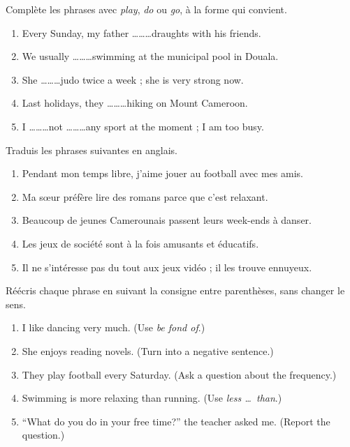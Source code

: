 \documentclass[11pt]{article}
\newcounter{popsec}
\newcounter{popsub}
\newcommand{\courssub}[1]{%
  \stepcounter{popsub}%
  \par\vspace{9pt}\noindent{\popxbold\fontsize{11.5}{13}\selectfont\color{popink}{\color{poporange}\thepopsec.\thepopsub}\hspace{6pt}#1}\par\nopagebreak\vspace{4pt}
}
\begin{document}
\begin{exercice}
Complète les phrases avec \emph{play}, \emph{do} ou \emph{go}, à la forme qui convient.
\begin{enumerate}
\item Every Sunday, my father \ldots\ldots\ldots draughts with his friends.
\item We usually \ldots\ldots\ldots swimming at the municipal pool in Douala.
\item She \ldots\ldots\ldots judo twice a week ; she is very strong now.
\item Last holidays, they \ldots\ldots\ldots hiking on Mount Cameroon.
\item I \ldots\ldots\ldots not \ldots\ldots\ldots any sport at the moment ; I am too busy.
\end{enumerate}
\end{exercice}

\courssub{Je m'entraîne}

\begin{exercice}[Traduction]
Traduis les phrases suivantes en anglais.
\begin{enumerate}
\item Pendant mon temps libre, j'aime jouer au football avec mes amis.
\item Ma sœur préfère lire des romans parce que c'est relaxant.
\item Beaucoup de jeunes Camerounais passent leurs week-ends à danser.
\item Les jeux de société sont à la fois amusants et éducatifs.
\item Il ne s'intéresse pas du tout aux jeux vidéo ; il les trouve ennuyeux.
\end{enumerate}
\end{exercice}

\begin{exercice}
Réécris chaque phrase en suivant la consigne entre parenthèses, sans changer le sens.
\begin{enumerate}
\item I like dancing very much. (Use \emph{be fond of}.)
\item She enjoys reading novels. (Turn into a negative sentence.)
\item They play football every Saturday. (Ask a question about the frequency.)
\item Swimming is more relaxing than running. (Use \emph{less \ldots\ than}.)
\item “What do you do in your free time?” the teacher asked me. (Report the question.)
\end{enumerate}
\end{exercice}
\end{document}
